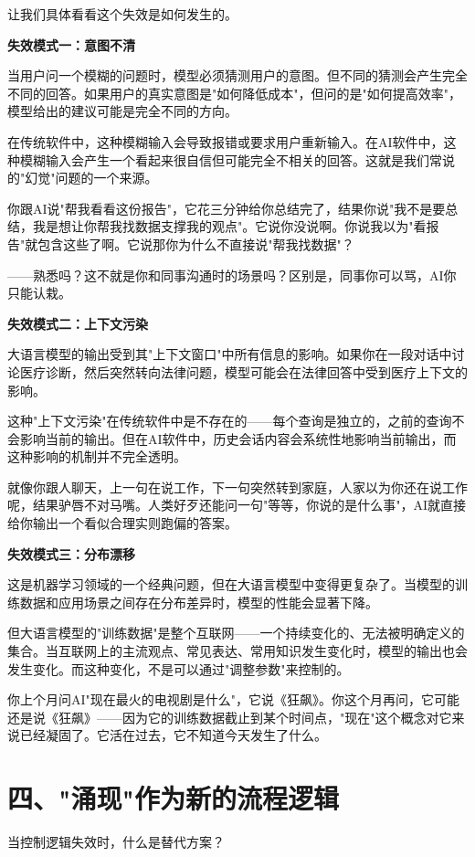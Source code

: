 让我们具体看看这个失效是如何发生的。

\textbf{失效模式一：意图不清}

当用户问一个模糊的问题时，模型必须猜测用户的意图。但不同的猜测会产生完全不同的回答。如果用户的真实意图是"如何降低成本"，但问的是"如何提高效率"，模型给出的建议可能是完全不同的方向。

在传统软件中，这种模糊输入会导致报错或要求用户重新输入。在AI软件中，这种模糊输入会产生一个看起来很自信但可能完全不相关的回答。这就是我们常说的"幻觉"问题的一个来源。

你跟AI说"帮我看看这份报告"，它花三分钟给你总结完了，结果你说"我不是要总结，我是想让你帮我找数据支撑我的观点"。它说你没说啊。你说我以为"看报告"就包含这些了啊。它说那你为什么不直接说"帮我找数据"？

——熟悉吗？这不就是你和同事沟通时的场景吗？区别是，同事你可以骂，AI你只能认栽。

\textbf{失效模式二：上下文污染}

大语言模型的输出受到其"上下文窗口"中所有信息的影响。如果你在一段对话中讨论医疗诊断，然后突然转向法律问题，模型可能会在法律回答中受到医疗上下文的影响。

这种"上下文污染"在传统软件中是不存在的——每个查询是独立的，之前的查询不会影响当前的输出。但在AI软件中，历史会话内容会系统性地影响当前输出，而这种影响的机制并不完全透明。

就像你跟人聊天，上一句在说工作，下一句突然转到家庭，人家以为你还在说工作呢，结果驴唇不对马嘴。人类好歹还能问一句"等等，你说的是什么事"，AI就直接给你输出一个看似合理实则跑偏的答案。

\textbf{失效模式三：分布漂移}

这是机器学习领域的一个经典问题，但在大语言模型中变得更复杂了。当模型的训练数据和应用场景之间存在分布差异时，模型的性能会显著下降。

但大语言模型的"训练数据"是整个互联网——一个持续变化的、无法被明确定义的集合。当互联网上的主流观点、常见表达、常用知识发生变化时，模型的输出也会发生变化。而这种变化，不是可以通过"调整参数"来控制的。

你上个月问AI"现在最火的电视剧是什么"，它说《狂飙》。你这个月再问，它可能还是说《狂飙》——因为它的训练数据截止到某个时间点，"现在"这个概念对它来说已经凝固了。它活在过去，它不知道今天发生了什么。

\section{四、"涌现"作为新的流程逻辑}


当控制逻辑失效时，什么是替代方案？

